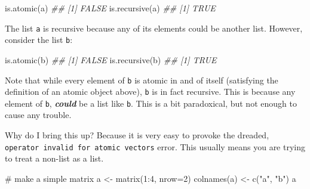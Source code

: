 \documentclass[
  13,
  letterpaper,
]{report}
\newenvironment{Shaded}{\begin{snugshade}}{\end{snugshade}}
\newcommand{\AttributeTok}[1]{\textcolor[rgb]{0.40,0.45,0.13}{#1}}
\newcommand{\CommentTok}[1]{\textcolor[rgb]{0.37,0.37,0.37}{#1}}
\newcommand{\DecValTok}[1]{\textcolor[rgb]{0.68,0.00,0.00}{#1}}
\newcommand{\DocumentationTok}[1]{\textcolor[rgb]{0.37,0.37,0.37}{\textit{#1}}}
\newcommand{\FunctionTok}[1]{\textcolor[rgb]{0.28,0.35,0.67}{#1}}
\newcommand{\NormalTok}[1]{\textcolor[rgb]{0.00,0.23,0.31}{#1}}
\newcommand{\OtherTok}[1]{\textcolor[rgb]{0.00,0.23,0.31}{#1}}
\newcommand{\SpecialCharTok}[1]{\textcolor[rgb]{0.37,0.37,0.37}{#1}}
\newcommand{\StringTok}[1]{\textcolor[rgb]{0.13,0.47,0.30}{#1}}
\begin{document}
\begin{Shaded}
\begin{Highlighting}[]
\FunctionTok{is.atomic}\NormalTok{(a)}
\DocumentationTok{\#\# [1] FALSE}
\FunctionTok{is.recursive}\NormalTok{(a)}
\DocumentationTok{\#\# [1] TRUE}
\end{Highlighting}
\end{Shaded}

The list \texttt{a} is recursive because any of its elements could be
another list. However, consider the list \texttt{b}:

\begin{Shaded}
\end{Shaded}

\begin{Shaded}
\begin{Highlighting}[]
\FunctionTok{is.atomic}\NormalTok{(b)}
\DocumentationTok{\#\# [1] FALSE}
\FunctionTok{is.recursive}\NormalTok{(b)}
\DocumentationTok{\#\# [1] TRUE}
\end{Highlighting}
\end{Shaded}

Note that while every element of \texttt{b} is atomic in and of itself
(satisfying the definition of an atomic object above), \texttt{b} is in
fact recursive. This is because any element of \texttt{b},
\textbf{\emph{could}} be a list like \texttt{b}. This is a bit
paradoxical, but not enough to cause any trouble.

Why do I bring this up? Because it is very easy to provoke the dreaded,
\texttt{operator\ invalid\ for\ atomic\ vectors} error. This usually
means you are trying to treat a non-list as a list.

\begin{Shaded}
\begin{Highlighting}[]
\CommentTok{\# make a simple matrix}
\NormalTok{a }\OtherTok{\textless{}{-}} \FunctionTok{matrix}\NormalTok{(}\DecValTok{1}\SpecialCharTok{:}\DecValTok{4}\NormalTok{, }\AttributeTok{nrow=}\DecValTok{2}\NormalTok{)}
\FunctionTok{colnames}\NormalTok{(a) }\OtherTok{\textless{}{-}} \FunctionTok{c}\NormalTok{(}\StringTok{"a"}\NormalTok{, }\StringTok{"b"}\NormalTok{)}
\NormalTok{a}
\end{Highlighting}
\end{Shaded}
\end{document}
